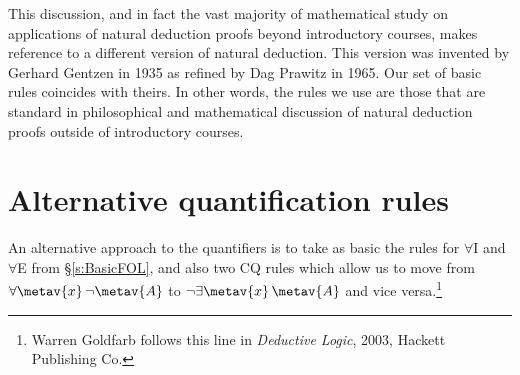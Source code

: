 This discussion, and in fact the vast majority of mathematical study on applications of natural deduction proofs beyond introductory courses, makes reference to a different version of natural deduction. This version was invented by Gerhard Gentzen in 1935 as refined by Dag Prawitz in 1965. Our set of basic rules coincides with theirs. In other words, the rules we use are those that are standard in philosophical and mathematical discussion of natural deduction proofs outside of introductory courses.



\section{Alternative quantification rules}
An alternative approach to the quantifiers is to take as basic the rules for $\forall$I and $\forall$E from \S\ref{s:BasicFOL}, and also two CQ rules which allow us to move from $\forall \metav{x}\, \enot \metav{A}$ to $\enot \exists \metav{x}\, \metav{A}$ and vice versa.\footnote{Warren Goldfarb follows this line in \textit{Deductive Logic}, 2003, Hackett Publishing Co.}  

